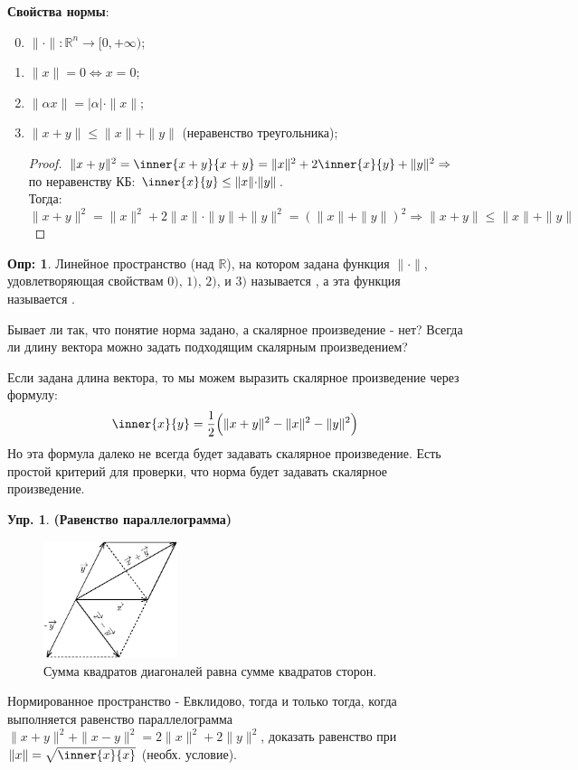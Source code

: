 \documentclass[12pt]{article}
\newcommand{\MR}{\mathbb{R}}
\theoremstyle{definition}
\newtheorem{defn}{Опр:}
\newtheorem{exrc}{Упр.}
\begin{document}
\textbf{Свойства нормы}:
\begin{enumerate}[label={\arabic*)}]
	\setcounter{enumi}{-1}
	\item $\|\cdot\| \colon \MR^n \to [0,+\infty)$; 
	\item $\|x\| = 0 \Leftrightarrow x = 0$;
	\item $\|\alpha x\| = |\alpha|\cdot\|x\|$;
	\item $\|x+y\| \leq \|x\| + \|y\|$ (неравенство треугольника);
	\begin{proof}
		$\|x+y\|^2 = \inner{x +y}{x+y} = \|x\|^2 + 2 \inner{x}{y} + \|y\|^2 \Rightarrow$ по неравенству КБ: $\inner{x}{y} \leq \|x\|{\cdot}\|y\|$. \\ 
		Тогда:
		$$ \|x+y\|^2 = \|x\|^2 + 2\|x\|{\cdot}\|y\| + \|y\|^2 = (\|x\| + \|y\|)^2 \Rightarrow \|x+y\| \leq \|x\| + \|y\|$$
	\end{proof}
\end{enumerate}

\begin{defn}
	Линейное пространство (над $\MR$), на котором задана функция $\|\cdot\|$, удовлетворяющая свойствам $0),\, 1), \, 2)$, и $3)$ называется , а эта функция называется .
\end{defn}
Бывает ли так, что понятие норма задано, а скалярное произведение - нет? Всегда ли длину вектора можно задать подходящим скалярным произведением? 

Если задана длина вектора, то мы можем выразить скалярное произведение через формулу:
$$\inner{x}{y} = \dfrac{1}{2}\Big( \|x+y\|^2 - \|x\|^2 - \|y\|^2 \Big)$$
Но эта формула далеко не всегда будет задавать скалярное произведение. Есть простой критерий для проверки, что норма будет задавать скалярное произведение.

\begin{exrc}\textbf{(Равенство параллелограмма)}
	\begin{figure}[H]
		\centering
		\includegraphics[width=0.35\textwidth]{3_1.eps}
		\caption{Сумма квадратов диагоналей равна сумме квадратов сторон.}
		\label{3_1}
	\end{figure}
Нормированное пространство - Евклидово, тогда и только тогда, когда выполняется равенство параллелограмма $\|x+y\|^2 + \|x-y\|^2 = 2\|x\|^2 + 2\|y\|^2$, доказать равенство при $\|x\| = \sqrt{\inner{x}{x}}$ (необх. условие).
\end{exrc}
\end{document}
